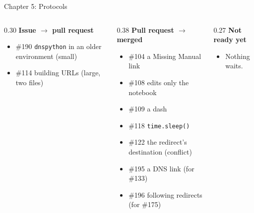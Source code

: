 \documentclass[9pt,aspectratio=169]{beamer}
\begin{document}
\begin{frame}{Chapter 5: Protocols}
    \begin{columns}[T]
        \begin{column}{0.30\textwidth}
            \textbf{Issue $\to$ pull request}
            \begin{itemize}\small
                \item \#190 \texttt{dnspython} in an older environment (small)
                \item \#114 building URLs (large, two files)
            \end{itemize}
        \end{column}
        \begin{column}{0.38\textwidth}
            \textbf{Pull request $\to$ merged}
            \begin{itemize}\small
                \item \#104 a Missing Manual link
                \item \#108 edits only the notebook
                \item \#109 a dash
                \item \#118 \texttt{time.sleep()}
                \item \#122 the redirect's destination (conflict)
                \item \#195 a DNS link (for \#133)
                \item \#196 following redirects (for \#175)
            \end{itemize}
        \end{column}
        \begin{column}{0.27\textwidth}
            \textbf{Not ready yet}
            \begin{itemize}\small
                \item Nothing waits.
            \end{itemize}
        \end{column}
    \end{columns}
\end{frame}
\end{document}
